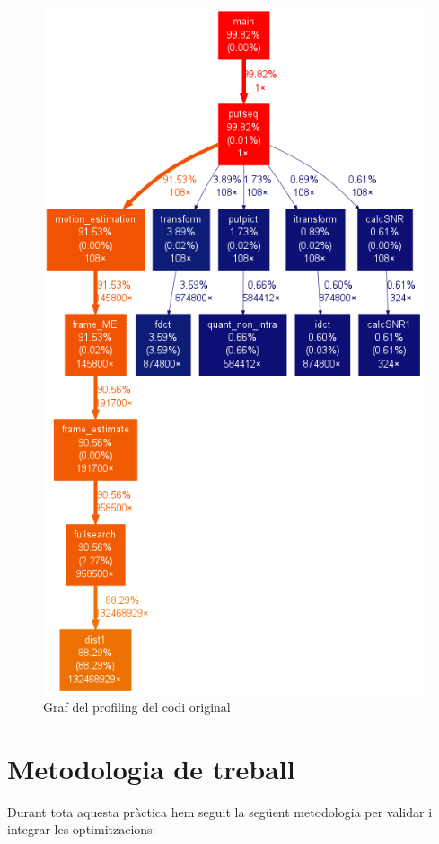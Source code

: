 \begin{figure}[hbtp]
\begin{center}
\includegraphics[scale=0.3]{img/output.png}
\caption{Graf del profiling del codi original}
\end{center}
\end{figure}

\section{Metodologia de treball}
Durant tota aquesta pràctica hem seguit la següent metodologia per validar i integrar les optimitzacions:

